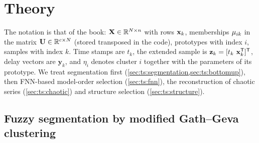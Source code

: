 \section{Theory}\label{sec:ts:theory}

The notation is that of the book: $\mathbf{X}\in\mathbb{R}^{N\times n}$ with rows $\mathbf{x}_k$, memberships $\mu_{ik}$ in the matrix $\mathbf{U}\in\mathbb{R}^{c\times N}$ (stored transposed in the code), prototypes with index $i$, samples with index $k$. Time stamps are $t_k$, the extended sample is $\mathbf{z}_k=[t_k\ \xk\T]\T$, delay vectors are $\mathbf{y}_k$, and $\eta_i$ denotes cluster $i$ together with the parameters of its prototype. We treat segmentation first (\cref{sec:ts:segmentation,sec:ts:bottomup}), then FNN-based model-order selection (\cref{sec:ts:fnn}), the reconstruction of chaotic series (\cref{sec:ts:chaotic}) and structure selection (\cref{sec:ts:structure}).

\subsection{Fuzzy segmentation by modified Gath--Geva clustering}\label{sec:ts:segmentation}

